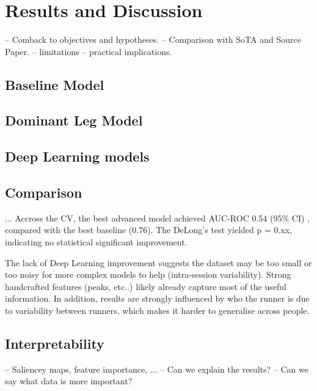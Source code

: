 \chapter{Results and Discussion}\label{chap:results-discussion}
-- Comback to objectives and hypotheses.
-- Comparison with SoTA and Source Paper.
-- limitations
-- practical implications.

\section{Baseline Model}\label{sec:results-baselines}

\section{Dominant Leg Model}\label{sec:results-dominant-leg}  %

\section{Deep Learning models}\label{sec:results-deep-learning}



\section{Comparison}\label{sec:results-comparison}
... Accross the CV, the best advanced model achieved AUC-ROC 0.54 (95\% CI) %
, compared with the best baseline (0.76). The DeLong's test yielded p = 0.xx, indicating no statistical significant improvement.

The lack of Deep Learning improvement suggests the dataset may be too small or too noisy for more complex models to help (intra-session variability). Strong handcrafted features (peaks, etc..) likely already capture most of the useful information. In addition, results are strongly influenced by who the runner is due to variability between runners, which makes it harder to generalise across people.

\section{Interpretability}\label{sec:results-interpretability}
-- Saliencey maps, feature importance, ...
-- Can we explain the results?
-- Can we say what data is more important?



